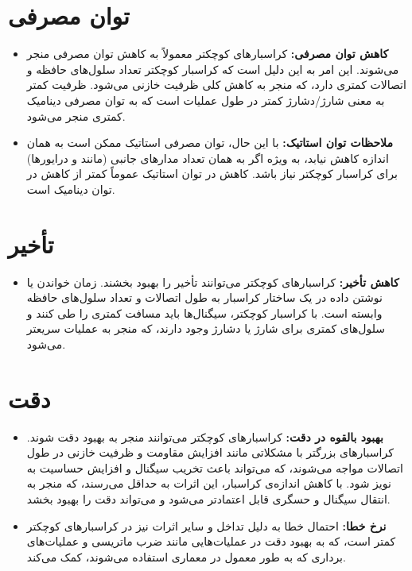 \documentclass[12pt]{exam}
\begin{document}
\begin{questions}
	\section{توان مصرفی}
	\begin{itemize}
		\item \textbf{کاهش توان مصرفی:} کراسبارهای کوچکتر معمولاً به کاهش توان مصرفی منجر می‌شوند. این امر به این دلیل است که کراسبار کوچکتر تعداد سلول‌های حافظه و اتصالات کمتری دارد، که منجر به کاهش کلی ظرفیت خازنی می‌شود. ظرفیت کمتر به معنی شارژ/دشارژ کمتر در طول عملیات است که به توان مصرفی دینامیک کمتری منجر می‌شود.
		\item \textbf{ملاحظات توان استاتیک:} با این حال، توان مصرفی استاتیک ممکن است به همان اندازه کاهش نیابد، به ویژه اگر به همان تعداد مدارهای جانبی (مانند  و درایورها) برای کراسبار کوچکتر نیاز باشد. کاهش در توان استاتیک عموماً کمتر از کاهش در توان دینامیک است.
	\end{itemize}
	
	\section{تأخیر}
	\begin{itemize}
		\item \textbf{کاهش تأخیر:} کراسبارهای کوچکتر می‌توانند تأخیر را بهبود بخشند. زمان خواندن یا نوشتن داده در یک ساختار کراسبار به طول اتصالات و تعداد سلول‌های حافظه وابسته است. با کراسبار کوچکتر، سیگنال‌ها باید مسافت کمتری را طی کنند و سلول‌های کمتری برای شارژ یا دشارژ وجود دارند، که منجر به عملیات سریعتر می‌شود.
	\end{itemize}
	
	\section{دقت}
	\begin{itemize}
		\item \textbf{بهبود بالقوه در دقت:} کراسبارهای کوچکتر می‌توانند منجر به بهبود دقت شوند. کراسبارهای بزرگتر با مشکلاتی مانند افزایش مقاومت و ظرفیت خازنی در طول اتصالات مواجه می‌شوند، که می‌تواند باعث تخریب سیگنال و افزایش حساسیت به نویز شود. با کاهش اندازه‌ی کراسبار، این اثرات به حداقل می‌رسند، که منجر به انتقال سیگنال و حسگری قابل اعتمادتر می‌شود و می‌تواند دقت را بهبود بخشد.
		\item \textbf{نرخ خطا:} احتمال خطا به دلیل تداخل و سایر اثرات نیز در کراسبارهای کوچکتر کمتر است، که به بهبود دقت در عملیات‌هایی مانند ضرب ماتریسی و عملیات‌های برداری که به طور معمول در معماری  استفاده می‌شوند، کمک می‌کند.
	\end{itemize}
	

\end{questions}
\end{document}
